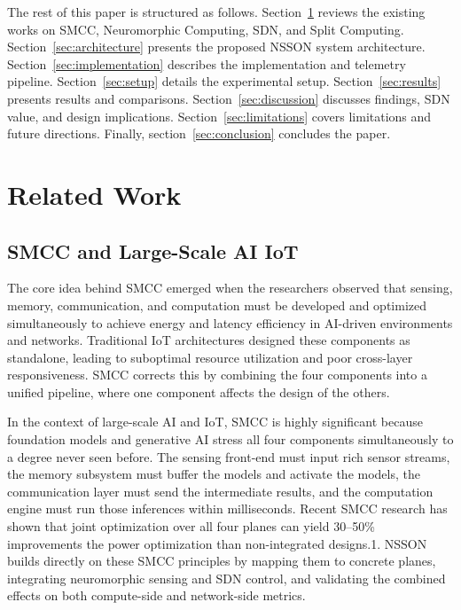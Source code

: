 \documentclass[journal]{IEEEtran}
\begin{document}
The rest of this paper is structured as follows. Section~\ref{sec:background}
reviews the existing works on SMCC, Neuromorphic Computing, SDN, and Split Computing.
Section~\ref{sec:architecture} presents the proposed NSSON system architecture.
Section~\ref{sec:implementation} describes the implementation and telemetry
pipeline. Section~\ref{sec:setup} details the experimental setup.
Section~\ref{sec:results} presents results and comparisons.
Section~\ref{sec:discussion} discusses findings, SDN value, and design
implications. Section~\ref{sec:limitations} covers limitations and future
directions. Finally, section~\ref{sec:conclusion} concludes the paper.

\section{Related Work}
\label{sec:background}

\subsection{SMCC and Large-Scale AI IoT}
The core idea behind SMCC emerged when the researchers observed that sensing, memory, communication, and computation must be developed and optimized simultaneously to achieve energy and latency efficiency in AI-driven environments and networks. Traditional IoT architectures designed these components as standalone, leading to suboptimal resource utilization and poor cross-layer responsiveness. SMCC corrects this by combining the four components into a unified pipeline, where one component affects the design of the others.

In the context of large-scale AI and IoT, SMCC is highly significant because foundation models and generative AI stress all four components simultaneously to a degree never seen before. The sensing front-end must input rich sensor streams, the memory subsystem must buffer the models and activate the models, the communication layer must send the intermediate results, and the computation engine must run those inferences within milliseconds. Recent SMCC research has shown that joint optimization over all four planes can yield 30--50\%
improvements the power optimization than non-integrated designs.1.
NSSON builds directly on these SMCC principles by mapping them to concrete planes, integrating neuromorphic sensing and SDN control, and validating the combined effects on both compute-side and network-side metrics.
\end{document}
